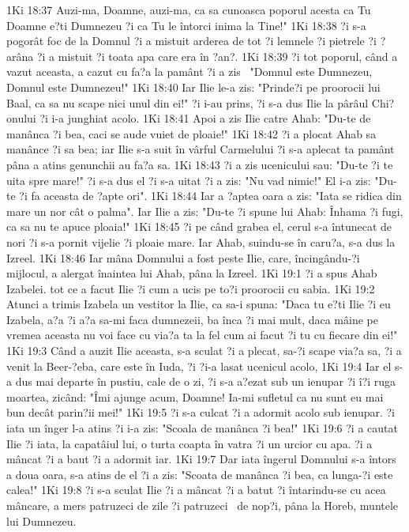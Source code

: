 1Ki 18:37  Auzi-ma, Doamne, auzi-ma, ca sa cunoasca poporul acesta ca Tu Doamne e?ti Dumnezeu ?i ca Tu le întorci inima la Tine!"
1Ki 18:38  ?i s-a pogorât foc de la Domnul ?i a mistuit arderea de tot ?i lemnele ?i pietrele ?i ?arâna ?i a mistuit ?i toata apa care era în ?an?.
1Ki 18:39  ?i tot poporul, când a vazut aceasta, a cazut cu fa?a la pamânt ?i a zis  "Domnul este Dumnezeu, Domnul este Dumnezeu!"
1Ki 18:40  Iar Ilie le-a zis: "Prinde?i pe proorocii lui Baal, ca sa nu scape nici unul din ei!" ?i i-au prins, ?i s-a dus Ilie la pârâul Chi?onului ?i i-a junghiat acolo.
1Ki 18:41  Apoi a zis Ilie catre Ahab: "Du-te de manânca ?i bea, caci se aude vuiet de ploaie!"
1Ki 18:42  ?i a plocat Ahab sa manânce ?i sa bea; iar Ilie s-a suit în vârful Carmelului ?i s-a aplecat ta pamânt pâna a atins genunchii au fa?a sa.
1Ki 18:43  ?i a zis ucenicului sau: "Du-te ?i te uita spre mare!" ?i s-a dus el ?i s-a uitat ?i a zis: "Nu vad nimic!" El i-a zis: "Du-te ?i fa aceasta de ?apte ori".
1Ki 18:44  Iar a ?aptea oara a zis: "Iata se ridica din mare un nor cât o palma". Iar Ilie a zis: "Du-te ?i spune lui Ahab: Înhama ?i fugi, ca sa nu te apuce ploaia!"
1Ki 18:45  ?i pe când grabea el, cerul s-a întunecat de nori ?i s-a pornit vijelie ?i ploaie mare. Iar Ahab, suindu-se în caru?a, s-a dus la Izreel.
1Ki 18:46  Iar mâna Domnului a fost peste Ilie, care, încingându-?i mijlocul, a alergat înaintea lui Ahab, pâna la Izreel.
1Ki 19:1  ?i a spus Ahab Izabelei. tot ce a facut Ilie ?i cum a ucis pe to?i proorocii cu sabia.
1Ki 19:2  Atunci a trimis Izabela un vestitor la Ilie, ca sa-i spuna: "Daca tu e?ti Ilie ?i eu Izabela, a?a ?i a?a sa-mi faca dumnezeii, ba înca ?i mai mult, daca mâine pe vremea aceasta nu voi face cu via?a ta la fel cum ai facut ?i tu cu fiecare din ei!"
1Ki 19:3  Când a auzit Ilie aceasta, s-a sculat ?i a plecat, sa-?i scape via?a sa, ?i a venit la Beer-?eba, care este în Iuda, ?i ?i-a lasat ucenicul acolo,
1Ki 19:4  Iar el s-a dus mai departe în pustiu, cale de o zi, ?i s-a a?ezat sub un ienupar ?i î?i ruga moartea, zicând: "Îmi ajunge acum, Doamne! Ia-mi sufletul ca nu sunt eu mai bun decât parin?ii mei!"
1Ki 19:5  ?i s-a culcat ?i a adormit acolo sub ienupar. ?i iata un înger l-a atins ?i i-a zis: "Scoala de manânca ?i bea!"
1Ki 19:6  ?i a cautat Ilie ?i iata, la capatâiul lui, o turta coapta în vatra ?i un urcior cu apa. ?i a mâncat ?i a baut ?i a adormit iar.
1Ki 19:7  Dar iata îngerul Domnului s-a întors a doua oara, s-a atins de el ?i a zis: "Scoata de manânca ?i bea, ca lunga-?i este calea!"
1Ki 19:8  ?i s-a sculat Ilie ?i a mâncat ?i a batut ?i întarindu-se cu acea mâncare, a mers patruzeci de zile ?i patruzeci  de nop?i, pâna la Horeb, muntele lui Dumnezeu.
